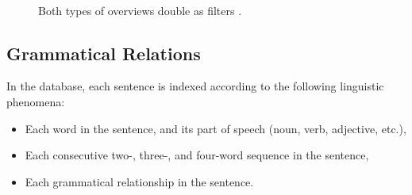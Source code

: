\documentclass{sig-alternate}
\begin{document}
\begin{enumerate}
\begin{figure}[ht!]
\begin{center}
%
        \\
%
    \end{center}
    \caption{%
     Both types of overviews double as filters \label{fig:intro04}.
     }%
\end{figure}

\subsection{Grammatical Relations}

 In the database, each sentence is indexed according to the following linguistic phenomena:
\begin{itemize}
  \item Each word in the sentence, and its part of speech (noun, verb, adjective, etc.),
  \item Each consecutive two-, three-, and four-word sequence in the sentence,
  \item Each grammatical relationship in the sentence. 
  \end{itemize}
  

\end{enumerate}
\end{document}
